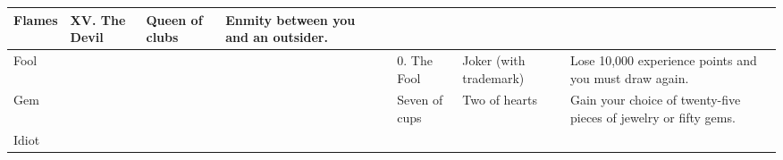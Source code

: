 \begin{longtable}{llllllll}
{\begin{minipage}[t]{2.168in}
Flames\end{minipage}} & \multicolumn{1}{|p{0.460in}|}{\begin{minipage}[t]{0.460in}\raggedright
XV. The Devil\end{minipage}} & \multicolumn{1}{p{0.872in}|}{\begin{minipage}[t]{0.872in}\raggedright
Queen of clubs\end{minipage}} & \multicolumn{1}{p{1.000in}|}{\begin{minipage}[t]{1.000in}\raggedright
Enmity between you and an outsider.\end{minipage}}\\
\hline
\multicolumn{5}{p{2.168in}|}{\begin{minipage}[t]{2.168in}\raggedright
Fool\end{minipage}} & \multicolumn{1}{|p{0.460in}|}{\begin{minipage}[t]{0.460in}\raggedright
0. The Fool\end{minipage}} & \multicolumn{1}{p{0.872in}|}{\begin{minipage}[t]{0.872in}\raggedright
Joker (with trademark)\end{minipage}} & \multicolumn{1}{p{1.000in}|}{\begin{minipage}[t]{1.000in}\raggedright
Lose 10,000 experience points and you must draw again.\end{minipage}}\\
\hline
\multicolumn{5}{p{2.168in}|}{\begin{minipage}[t]{2.168in}\raggedright
Gem\end{minipage}} & \multicolumn{1}{|p{0.460in}|}{\begin{minipage}[t]{0.460in}\raggedright
Seven of cups\end{minipage}} & \multicolumn{1}{p{0.872in}|}{\begin{minipage}[t]{0.872in}\raggedright
Two of hearts\end{minipage}} & \multicolumn{1}{p{1.000in}|}{\begin{minipage}[t]{1.000in}\raggedright
Gain your choice of twenty-five pieces of jewelry or fifty gems.\end{minipage}}\\
\hline
\multicolumn{5}{p{2.168in}|}{\begin{minipage}[t]{2.168in}\raggedright
Idiot\end{minipage}} & \multicolumn{1}{|p{0.460in}|}{\begin{minipage}[t]{0.460in}\raggedright

\end{minipage}}
\end{longtable}
